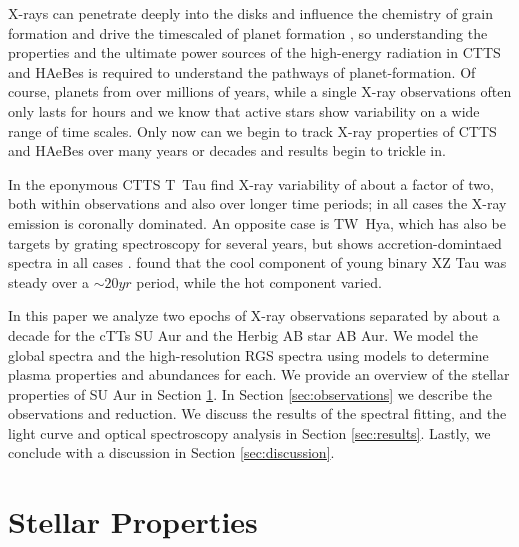 \documentclass[twocolumn]{aastex631}
\begin{document}
X-rays can penetrate deeply into the disks and influence the chemistry of grain formation \citep[review by][]{2000prpl.conf..429G} and drive the timescaled of planet formation \citep[see review by][]{2014prpl.conf..475A}, so understanding the properties and the ultimate power sources of the high-energy radiation in CTTS and HAeBes is required to understand the pathways of planet-formation. Of course, planets from over millions of years, while a single X-ray observations often only lasts for hours and we know that active stars show variability on a wide range of time scales. Only now can we begin to track X-ray properties of CTTS and HAeBes over many years or decades and results begin to trickle in. 

In the eponymous CTTS T~Tau \citet{schneider_multiepoch_2018} find X-ray variability of about a factor of two, both within observations and also over longer time periods; in all cases the X-ray emission is coronally dominated. An opposite case is TW~Hya, which has also be targets by grating spectroscopy for several years, but shows accretion-domintaed spectra in all cases \citep{2009A&A...505..755R,2012ApJ...760L..21B}.
\citet{silverberg_stable_2023} found that the cool component of young binary XZ Tau was steady over a $\sim 20 yr$ period, while the hot component varied.


% 

In this paper we analyze two epochs of X-ray observations separated by about a decade for the cTTs SU Aur and the Herbig AB star AB Aur. We model the global spectra and the high-resolution RGS spectra using models to determine plasma properties and abundances for each. We provide an overview of the stellar properties of SU Aur in Section \ref{sec:star}. In Section \ref{sec:observations} we describe the observations and reduction. We discuss the results of the spectral fitting, and the light curve and optical spectroscopy analysis in Section \ref{sec:results}. Lastly, we conclude with a discussion in Section \ref{sec:discussion}.

\section{Stellar Properties} \label{sec:star}
\end{document}
